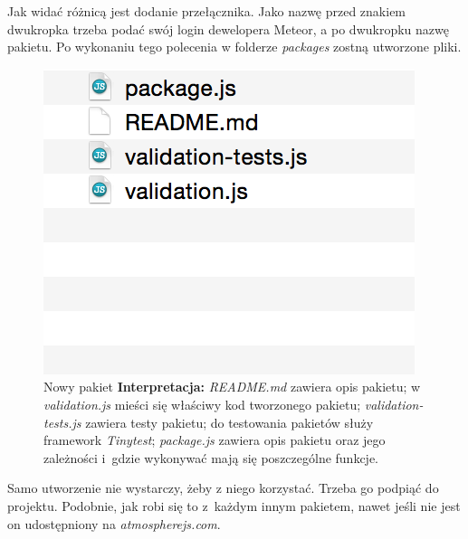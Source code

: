 \documentclass[openright]{xmgr}
\begin{document}
\noindent Jak widać różnicą jest dodanie przełącznika. Jako nazwę przed znakiem dwukropka trzeba podać swój login dewelopera Meteor, a po dwukropku nazwę pakietu.  Po wykonaniu tego polecenia w folderze \textit{packages} zostną utworzone pliki.

\begin{figure}[H]
\centering
\includegraphics[width=0.7\hsize]{images/newPackage}
\caption{Nowy pakiet\label{RYS.19} \newline \newline \hspace{\linewidth} \textbf{Interpretacja:} \textit{README.md} zawiera opis pakietu; w  \textit{validation.js} mieści się właściwy kod tworzonego pakietu; \textit{validation-tests.js} zawiera testy pakietu; do testowania pakietów służy framework \textit{Tinytest}; \textit{package.js} zawiera opis pakietu oraz jego zależności i~gdzie wykonywać mają się poszczególne funkcje.}
\end{figure}


\noindent Samo utworzenie nie wystarczy, żeby z niego korzystać. Trzeba go podpiąć do projektu. Podobnie, jak robi się to z~każdym innym pakietem, nawet jeśli nie jest on udostępniony na \textit{atmospherejs.com}.\cite{Packages}\cite{MeteorDocs}\cite{DiscoverMeteor2013}
\end{document}
